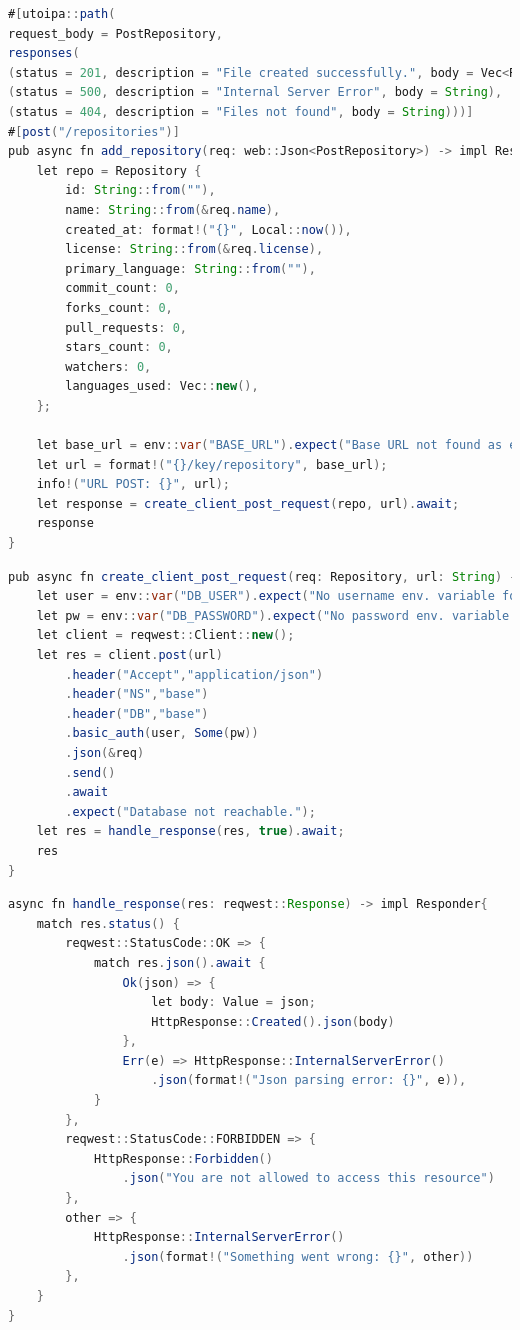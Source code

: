 \documentclass[notitlepage, hidelinks]{article}
\begin{document}
\begin{lstlisting}[language=Java,frame=single,caption=Programmatischer Endpunkt mit Dokumentation für Swagger (mit CodeGen),label=apione]
#[utoipa::path(
request_body = PostRepository,
responses(
(status = 201, description = "File created successfully.", body = Vec<ResponseInfo>),
(status = 500, description = "Internal Server Error", body = String),
(status = 404, description = "Files not found", body = String)))]
#[post("/repositories")]
pub async fn add_repository(req: web::Json<PostRepository>) -> impl Responder {
    let repo = Repository {
        id: String::from(""),
        name: String::from(&req.name),
        created_at: format!("{}", Local::now()),
        license: String::from(&req.license),
        primary_language: String::from(""),
        commit_count: 0,
        forks_count: 0,
        pull_requests: 0,
        stars_count: 0,
        watchers: 0,
        languages_used: Vec::new(),
    };

    let base_url = env::var("BASE_URL").expect("Base URL not found as environment variable");
    let url = format!("{}/key/repository", base_url);
    info!("URL POST: {}", url);
    let response = create_client_post_request(repo, url).await;
    response
}
\end{lstlisting}


\begin{lstlisting}[language=Java,frame=single,caption=Senden eines HTTP Requests (hier an die Datenbank) mit Headern,label=apitwo]
pub async fn create_client_post_request(req: Repository, url: String) -> impl Responder{
    let user = env::var("DB_USER").expect("No username env. variable found");
    let pw = env::var("DB_PASSWORD").expect("No password env. variable found");
    let client = reqwest::Client::new();
    let res = client.post(url)
        .header("Accept","application/json")
        .header("NS","base")
        .header("DB","base")
        .basic_auth(user, Some(pw))
        .json(&req)
        .send()
        .await
        .expect("Database not reachable.");
    let res = handle_response(res, true).await;
    res
}
\end{lstlisting}

\begin{lstlisting}[language=Java,frame=single,caption=Auflösung des Responses (als Option) mit Pattern Matching,label=apitwo]
async fn handle_response(res: reqwest::Response) -> impl Responder{
    match res.status() {
        reqwest::StatusCode::OK => {
            match res.json().await {
                Ok(json) => {
                    let body: Value = json;
                    HttpResponse::Created().json(body)
                },
                Err(e) => HttpResponse::InternalServerError()
                    .json(format!("Json parsing error: {}", e)),
            }
        },
        reqwest::StatusCode::FORBIDDEN => {
            HttpResponse::Forbidden()
                .json("You are not allowed to access this resource")
        },
        other => {
            HttpResponse::InternalServerError()
                .json(format!("Something went wrong: {}", other))
        },
    }
}
\end{lstlisting}
\end{document}

